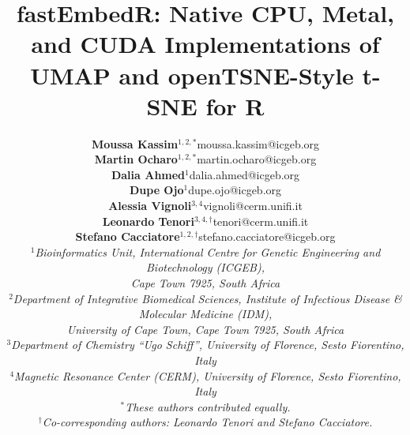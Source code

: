 \documentclass[twoside,11pt]{article}
\begin{document}
\title{fastEmbedR: Native CPU, Metal, and CUDA Implementations of UMAP and openTSNE-Style t-SNE for R}

\author{{\small\bf Moussa Kassim$^{1,2,\ast}$}\hfill{\footnotesize\sc moussa.kassim@icgeb.org}\\[-1pt]
{\small\bf Martin Ocharo$^{1,2,\ast}$}\hfill{\footnotesize\sc martin.ocharo@icgeb.org}\\[-1pt]
{\small\bf Dalia Ahmed$^{1}$}\hfill{\footnotesize\sc dalia.ahmed@icgeb.org}\\[-1pt]
{\small\bf Dupe Ojo$^{1}$}\hfill{\footnotesize\sc dupe.ojo@icgeb.org}\\[-1pt]
{\small\bf Alessia Vignoli$^{3,4}$}\hfill{\footnotesize\sc vignoli@cerm.unifi.it}\\[-1pt]
{\small\bf Leonardo Tenori$^{3,4,\dagger}$}\hfill{\footnotesize\sc tenori@cerm.unifi.it}\\[-1pt]
{\small\bf Stefano Cacciatore$^{1,2,\dagger}$}\hfill{\footnotesize\sc stefano.cacciatore@icgeb.org}\\[-1pt]
{\footnotesize\it $^1$Bioinformatics Unit, International Centre for Genetic Engineering and Biotechnology (ICGEB),\\
Cape Town 7925, South Africa\\
$^2$Department of Integrative Biomedical Sciences, Institute of Infectious Disease \& Molecular Medicine (IDM),\\
University of Cape Town, Cape Town 7925, South Africa\\
$^3$Department of Chemistry ``Ugo Schiff'', University of Florence, Sesto Fiorentino, Italy\\
$^4$Magnetic Resonance Center (CERM), University of Florence, Sesto Fiorentino, Italy\\
$^\ast$These authors contributed equally.\\
$^\dagger$Co-corresponding authors: Leonardo Tenori and Stefano Cacciatore.}}


\maketitle
\end{document}
